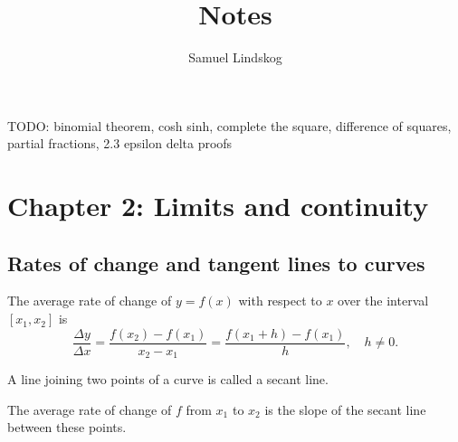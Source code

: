 \documentclass{article}
\title{Notes}
\author{Samuel Lindskog}
\begin{document}
\maketitle
{}
\tableofcontents
{}
\clearpage
{}
\setcounter{page}{1}
TODO: binomial theorem, cosh sinh, complete the square, difference of squares, partial fractions, 2.3 epsilon delta proofs
\section{Chapter 2: Limits and continuity}
\subsection{Rates of change and tangent lines to curves}
\begin{definition}
	The average rate of change of \(y=f(x)\) with respect to \(x\) over the interval \([x_1,x_2]\) is
	\begin{equation*}
		\frac{\Delta y}{\Delta x}=\frac{f(x_2)-f(x_1)}{x_2-x_1}=\frac{f(x_1+h)-f(x_1)}{h},\quad h\neq 0.
	\end{equation*}
\end{definition}
\begin{definition}
	A line joining two points of a curve is called a secant line.
\end{definition}
\begin{remark}
	The average rate of change of \(f\) from \(x_1\) to \(x_2\) is the slope of the secant line between these points.
\end{remark}
\end{document}
